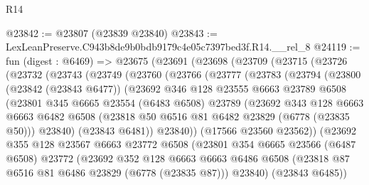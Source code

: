 \begin{lexlean}{R14}
\begin{coremodule}
@23842 := @23807 (@23839 @23840)
@23843 := LexLeanPreserve.C943b8de9b0bdb9179c4e05c7397bed3f.R14.__rel_8
@24119 := fun (digest : @6469) =>
  @23675
    (@23691
      (@23698
        (@23709
          (@23715
            (@23726
              (@23732
                (@23743
                  (@23749
                    (@23760
                      (@23766
                        (@23777
                          (@23783
                            (@23794
                              (@23800
                                (@23842 (@23843 @6477))
                                (@23692
                                  @346
                                  @128
                                  @23555
                                  @6663
                                  @23789
                                  @6508
                                  (@23801
                                    @345
                                    @6665
                                    @23554
                                    (@6483 @6508)
                                    @23789
                                    (@23692
                                      @343
                                      @128
                                      @6663
                                      @6663
                                      @6482
                                      @6508
                                      (@23818 @50 @6516 @81 @6482 @23829 (@6778 (@23835 @50)))
                                      @23840)
                                    (@23843 @6481))
                                  @23840))
                              (@17566 @23560 @23562))
                            (@23692
                              @355
                              @128
                              @23567
                              @6663
                              @23772
                              @6508
                              (@23801
                                @354
                                @6665
                                @23566
                                (@6487 @6508)
                                @23772
                                (@23692
                                  @352
                                  @128
                                  @6663
                                  @6663
                                  @6486
                                  @6508
                                  (@23818 @87 @6516 @81 @6486 @23829 (@6778 (@23835 @87)))
                                  @23840)
                                (@23843 @6485))

\end{coremodule}
\end{lexlean}
